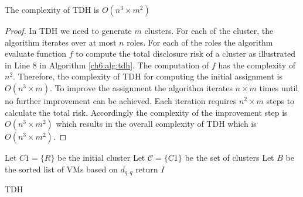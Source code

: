\begin{lemma}
The  complexity of TDH is $O(n^3 \times m^2 )$
\end{lemma}
\begin{proof}
In TDH we need to generate $m$ clusters. For each of the cluster, the algorithm iterates over at most $n$ roles. For each of the roles the algorithm evaluate function  $f$ to compute the total disclosure risk of a cluster as illustrated in Line 8 in Algorithm \ref{ch6:alg:tdh}. The computation of $f$ has the complexity of $n^2$. Therefore, the complexity of TDH for computing the initial assignment is $O(n^3 \times m )$. To improve the assignment the algorithm iterates $n \times m$ times until no further improvement can be achieved. Each iteration requires $n^2\times m$ steps to calculate the total risk. Accordingly the complexity of the improvement step  is $O(n^3 \times m^2 )$ which results in the overall  complexity of TDH which is $O(n^3 \times m^2 )$.
  \end{proof}

\begin{algorithm}[t!]

\small
{}
    Let $C1=\{R\}$ be the initial cluster\;
    Let $\mathcal{C} = \{C1\}$ be the set of clusters\;
 Let $B$ be the sorted list of VMs based on $d_{q,q}$\;	
 return $I$\;

\caption{TDH}
\label{ch6:alg:tdh}
\end{algorithm}		

